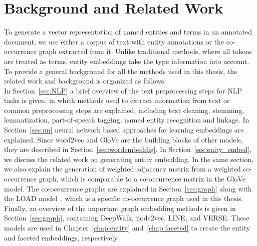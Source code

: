 
\chapter{Background and Related Work}\label{chap:background}
To generate a vector representation of named entities and terms in an annotated document, we use either a corpus of text with entity annotations or the co-occurrence graph extracted from it. Unlike traditional methods, where all tokens are treated as terms, entity embeddings take the type information into account. To provide a general background for all the methods used in this thesis, the related work and background is organized as follows:\\
In Section~\ref{sec:NLP} a brief overview of the text preprocessing steps for NLP tasks is given, in which methods used to extract information from text or common preprocessing steps are explained, including text cleaning, stemming, lemmatization, part-of-speech tagging, named entity recognition and linkage.  In Section~\ref{sec:nn} neural network based approaches for learning embeddings are explained. Since word2vec and GloVe are the building blocks of other models, they are described in Section~\ref{sec:wordembeddig}.  In Section~\ref{sec:enity_embed}, we discuss the related work on generating entity embedding.  In the same section, we also explain the generation of  weighted adjacency matrix from a weighted co-occurrence graph, which is comparable to a co-occurrence matrix in the GloVe model. The co-occurrence graphs are explained in Section~\ref{sec:graph} along with the LOAD model~, which is a specific co-occurrence graph used in this thesis. Finally, an overview of the important graph embedding methods is given in Section~\ref{sec:graph}, containing DeepWalk, node2vec, LINE, and VERSE. These models are used  in Chapter~\ref{chap:entity} and~\ref{chap:faceted} to create the entity and faceted embeddings, respectively. 

